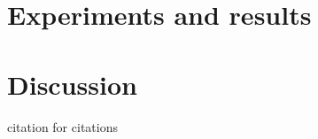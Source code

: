 \documentclass[a4paper]{report}
\begin{document}
% 
%
\chapter{Experiments and results}
\label{chap:exp}

%
\chapter{Discussion}

%
% 
%
% 
%


\newpage
citation for citations\cite{Bengtsson1995}




\newpage



% 
\end{document}
